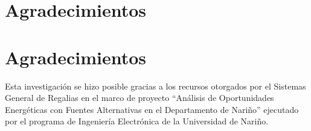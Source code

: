 \documentclass[conference]{IEEEtran}
\begin{document}
\thispagestyle{empty} 

\IEEEpeerreviewmaketitle










\ifCLASSOPTIONcompsoc
  \section*{Agradecimientos}
\else
  \section*{Agradecimientos}
\fi

Esta investigación se hizo posible gracias a los recursos otorgados por el Sistemas General de Regalias en el marco de proyecto ``Análisis de Oportunidades Energéticas con Fuentes Alternativas en el Departamento de Nariño'' ejecutado por el programa de Ingeniería Electrónica de la Universidad de Nariño.

\ifCLASSOPTIONcaptionsoff
  \newpage
\fi





\end{document}
